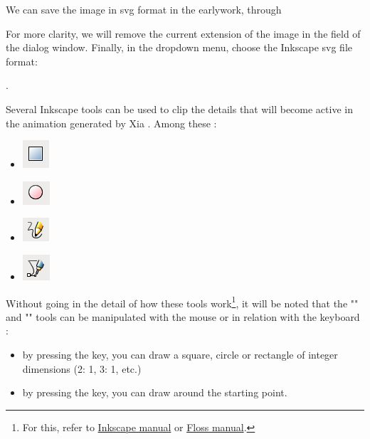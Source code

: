 We can save the image in svg format in the earlywork, 
through 


For more clarity, we will remove the current extension of the image 
in the field  of the dialog window. Finally, in the 
dropdown menu, choose the Inkscape svg file format:

.

Several Inkscape tools can be used to clip the details that
will become active in the animation generated by Xia . Among these :
\begin{itemize}
 \item \includegraphics[scale=0.5]{./images/rec_carre} 
 \item \includegraphics[scale=0.5]{./images/cercles} 
 \item \includegraphics[scale=0.5]{./images/lignes} 
 \item \includegraphics[scale=0.5]{./images/bezier} 
\end{itemize}

Without going in the detail of how these tools work\footnote{For this, 
refer to \href{http://inkscape.org/doc/shapes/tutorial-shapes.fr.html}{Inkscape manual} or \href{http://en.flossmanuals.net/inkscape/}{Floss manual}.}, 
it will be noted that the "" and ""  tools can be manipulated with the mouse or 
in relation with the keyboard :
\begin{itemize}
  \item by pressing the \Ctrl key, you can draw a square, 
circle or rectangle of integer dimensions (2: 1, 3: 1, etc.)
  \item by pressing the \Shift key, you can draw around the starting point.
\end{itemize}

